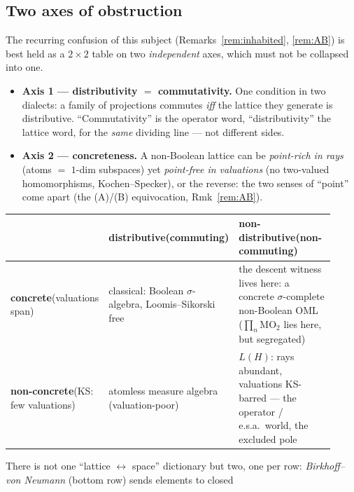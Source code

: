 \documentclass[11pt,reqno]{amsart}
\theoremstyle{plain}
\theoremstyle{definition}
\theoremstyle{remark}
\begin{document}
\subsection{Two axes of obstruction}
\label{sec:twoaxes}
The recurring confusion of this subject
(Remarks~\ref{rem:inhabited}, \ref{rem:AB}) is best held as a
$2\times2$ table on two \emph{independent} axes, which must not be collapsed
into one.
\begin{itemize}
  \item \textbf{Axis 1 --- distributivity $=$ commutativity.} One condition in two
    dialects: a family of projections commutes \emph{iff} the lattice they generate
    is distributive. ``Commutativity'' is the operator word, ``distributivity'' the
    lattice word, for the \emph{same} dividing line --- not different sides.
  \item \textbf{Axis 2 --- concreteness.} A non-Boolean lattice can be
    \emph{point-rich in rays} (atoms $=$ $1$-dim subspaces) yet \emph{point-free in
    valuations} (no two-valued homomorphisms, Kochen--Specker), or the reverse: the
    two senses of ``point'' come apart (the (A)/(B) equivocation, Rmk~\ref{rem:AB}).
\end{itemize}
\begin{center}
\begin{tabular}{@{}>{\raggedright\arraybackslash}p{0.17\linewidth}>{\raggedright\arraybackslash}p{0.33\linewidth}>{\raggedright\arraybackslash}p{0.42\linewidth}@{}}
\toprule
 & \textbf{distributive\newline(commuting)} & \textbf{non-distributive\newline(non-commuting)} \\
\midrule
\textbf{concrete}\newline(valuations span) & classical: Boolean $\sigma$-algebra,
  Loomis--Sikorski free & the descent witness lives here: a concrete
  $\sigma$-complete non-Boolean OML ($\prod_n\mathrm{MO}_2$ lies here, but
  segregated) \\[4pt]
\textbf{non-concrete}\newline(KS: few valuations) & atomless measure algebra
  (valuation-poor) & $L(H)$: rays abundant, valuations KS-barred --- the operator /
  e.s.a.\ world, the excluded pole \\
\bottomrule
\end{tabular}
\end{center}
\noindent There is not one ``lattice $\leftrightarrow$ space'' dictionary but two,
one per row: \emph{Birkhoff--von Neumann} (bottom row) sends elements to closed
\end{document}
